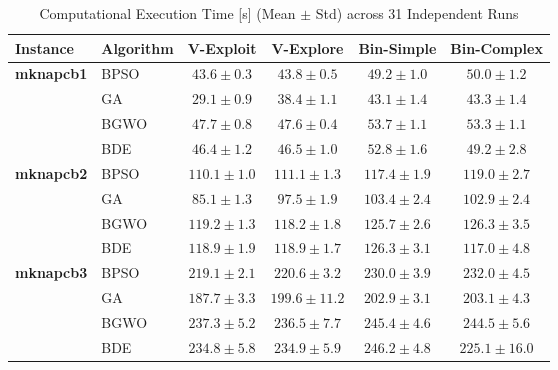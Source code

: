 \begin{table}[htbp]
  \centering
  \small
  \caption{Computational Execution Time [s] (Mean $\pm$ Std) across 31 Independent Runs}
  \label{tab:computational_cost}
  \begin{tabular*}{\textwidth}{@{\extracolsep{\fill}}llcccc@{}}
    \toprule
    \textbf{Instance} & \textbf{Algorithm} & \textbf{V-Exploit} & \textbf{V-Explore} & \textbf{Bin-Simple} & \textbf{Bin-Complex} \\
    \midrule
    \textbf{mknapcb1}  & BPSO  &  $\mathbf{43.6 \pm 0.3}$ &           $43.8 \pm 0.5$ &           $49.2 \pm 1.0$ &           $50.0 \pm 1.2$ \\
                       & GA    &  $\mathbf{29.1 \pm 0.9}$ &           $38.4 \pm 1.1$ &           $43.1 \pm 1.4$ &           $43.3 \pm 1.4$ \\
                       & BGWO  &           $47.7 \pm 0.8$ &  $\mathbf{47.6 \pm 0.4}$ &           $53.7 \pm 1.1$ &           $53.3 \pm 1.1$ \\
                       & BDE   &  $\mathbf{46.4 \pm 1.2}$ &           $46.5 \pm 1.0$ &           $52.8 \pm 1.6$ &           $49.2 \pm 2.8$ \\
    \midrule
    \textbf{mknapcb2}  & BPSO  & $\mathbf{110.1 \pm 1.0}$ &          $111.1 \pm 1.3$ &          $117.4 \pm 1.9$ &          $119.0 \pm 2.7$ \\
                       & GA    &  $\mathbf{85.1 \pm 1.3}$ &           $97.5 \pm 1.9$ &          $103.4 \pm 2.4$ &          $102.9 \pm 2.4$ \\
                       & BGWO  &          $119.2 \pm 1.3$ & $\mathbf{118.2 \pm 1.8}$ &          $125.7 \pm 2.6$ &          $126.3 \pm 3.5$ \\
                       & BDE   &          $118.9 \pm 1.9$ &          $118.9 \pm 1.7$ &          $126.3 \pm 3.1$ & $\mathbf{117.0 \pm 4.8}$ \\
    \midrule
    \textbf{mknapcb3}  & BPSO  & $\mathbf{219.1 \pm 2.1}$ &          $220.6 \pm 3.2$ &          $230.0 \pm 3.9$ &          $232.0 \pm 4.5$ \\
                       & GA    & $\mathbf{187.7 \pm 3.3}$ &         $199.6 \pm 11.2$ &          $202.9 \pm 3.1$ &          $203.1 \pm 4.3$ \\
                       & BGWO  &          $237.3 \pm 5.2$ & $\mathbf{236.5 \pm 7.7}$ &          $245.4 \pm 4.6$ &          $244.5 \pm 5.6$ \\
                       & BDE   &          $234.8 \pm 5.8$ &          $234.9 \pm 5.9$ &          $246.2 \pm 4.8$ & $\mathbf{225.1 \pm 16.0}$ \\

\end{tabular*}
\end{table}

